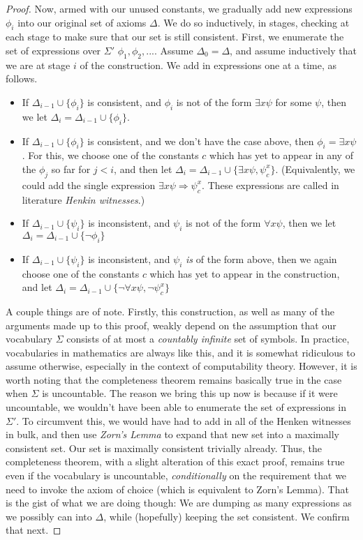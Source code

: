 \begin{proof}
    \par Now, armed with our unused constants, we gradually add new expressions $\phi_i$ into our original set of axioms $\Delta$. We do so inductively, in stages, checking at each stage to make sure that our set is still consistent. First, we enumerate the set of expressions over $\Sigma'$ $\phi_1,\phi_2,...$. Assume $\Delta_0 = \Delta$, and assume inductively that we are at stage $i$ of the construction. We add in expressions one at a time, as follows. 
    \begin{itemize}
        \item If $\Delta_{i-1} \cup \{\phi_i\}$ is consistent, and $\phi_i$ is not of the form $\exists x \psi$ for some $\psi$, then we let $\Delta_i = \Delta_{i-1} \cup \{\phi_i\}$.
        \item If $\Delta_{i-1} \cup \{\phi_i\}$ is consistent, and we don't have the case above, then $\phi_i = \exists x \psi$. For this, we choose one of the constants $c$ which has yet to appear in any of the $\phi_j$ so far for $j<i$, and then let $\Delta_i = \Delta_{i-1} \cup \{\exists x \psi, \psi_c^x\}$. (Equivalently, we could add the single expression $\exists x \psi \Rightarrow \psi_c^x$. These expressions are called in literature \textit{Henkin witnesses}.)
        \item If $\Delta_{i-1} \cup \{\psi_i\}$ is inconsistent, and $\psi_i$ is not of the form $\forall x \psi$, then we let $\Delta_i = \Delta_{i-1} \cup \{\neg \phi_i\}$
        \item If $\Delta_{i-1} \cup \{\psi_i\}$ is inconsistent, and $\psi_i$ \textit{is} of the form above, then we again choose one of the constants $c$ which has yet to appear in the construction, and let $\Delta_i = \Delta_{i-1} \cup \{\neg \forall x \psi, \neg \psi_c^x\}$
    \end{itemize}
    A couple things are of note. Firstly, this construction, as well as many of the arguments made up to this proof, weakly depend on the assumption that our vocabulary $\Sigma$ consists of at most a \textit{countably infinite} set of symbols. In practice, vocabularies in mathematics are always like this, and it is somewhat ridiculous to assume otherwise, especially in the context of computability theory. However, it is worth noting that the completeness theorem remains basically true in the case when $\Sigma$ is uncountable. The reason we bring this up now is because if it were uncountable, we wouldn't have been able to enumerate the set of expressions in $\Sigma'$. To circumvent this, we would have had to add in all of the Henken witnesses in bulk, and then use \textit{Zorn's Lemma} to expand that new set into a maximally consistent set. Our set is maximally consistent trivially already. Thus, the completeness theorem, with a slight alteration of this exact proof, remains true even if the vocabulary is uncountable, \textit{conditionally} on the requirement that we need to invoke the axiom of choice (which is equivalent to Zorn's Lemma). That is the gist of what we are doing though: We are dumping as many expressions as we possibly can into $\Delta$, while (hopefully) keeping the set consistent. We confirm that next.

\end{proof}
